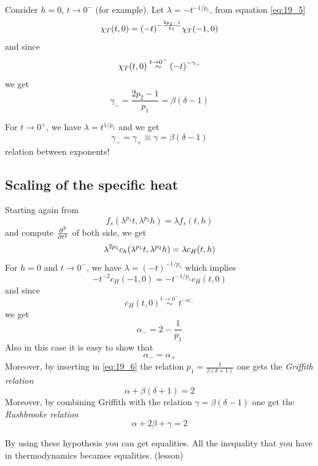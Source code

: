 \documentclass[../main/main.tex]{subfiles}
\begin{document}
Consider \( h=0 \), \( t \rightarrow 0^- \) (for example).
 Let \( \lambda = - t ^{-1/p_1} \), from equation \eqref{eq:19_5}
\begin{equation}
  \chi _T (t,0) = \qty(-t)^{-\frac{2p_2-1}{p_1}} \chi _T (-1,0)
\end{equation}
and since
\begin{equation}
  \chi _T (t,0) \overset{t \rightarrow 0^-}{\sim } \qty(-t)^{-\gamma_-  }
\end{equation}
we get
\begin{equation}
  \gamma _- = \frac{2p_2 -1}{p_1} = \beta (\delta -1)
\end{equation}
\begin{remark}
For \( t \rightarrow 0^+ \), we have \( \lambda  = t ^{1/p_1} \) and we get
\begin{equation}
  \gamma _- = \gamma _+ \equiv \gamma  = \beta (\delta -1)
\end{equation}
relation between exponents!
\end{remark}

\subsection{Scaling of the specific heat}
Starting again from
\begin{equation}
  f_s ( \lambda^{p_1} t, \lambda ^{p_2}h) = \lambda f_s (t,h)
\end{equation}
and compute \( \pdv[2]{}{t}  \) of both side, we get
\begin{equation}
  \lambda ^{2p_1}c_h \qty(\lambda ^{p_1}t, \lambda ^{p_2}h) = \lambda c_H (t,h)
\end{equation}
For \( h=0 \) and \( t \rightarrow 0^- \), we have \( \lambda = (-t)^{-1/p_1} \) which implies
\begin{equation}
  - t^{-2} c_H (-1,0) = - t ^{-1/p_1} c_H (t,0)
\end{equation}
and since
\begin{equation}
  c_H (t,0) \overset{t \rightarrow 0^-}{\sim } t^{-\alpha _-}
\end{equation}
we get
\begin{equation}
  \alpha _- = 2 - \frac{1}{p_1}
  \label{eq:19_6}
\end{equation}
Also in this case it is easy to show that
\begin{equation}
  \alpha _- = \alpha _+
\end{equation}
Moreover, by inserting in \eqref{eq:19_6} the relation \( p_1 = \frac{1}{\beta (\delta +1)} \) one gets the \emph{Griffith relation}
\begin{equation}
  \alpha + \beta (\delta +1) = 2
\end{equation}
Moreover, by combining Griffith with the relation \( \gamma = \beta (\delta -1)  \) one get the \emph{Rushbrooke relation}
\begin{equation}
  \alpha + 2 \beta + \gamma = 2
\end{equation}
\begin{remark}
By using these hypothesis you can get equalities. All the inequality that you have in thermodynamics becames equalities. (lesson)
\end{remark}
\end{document}

